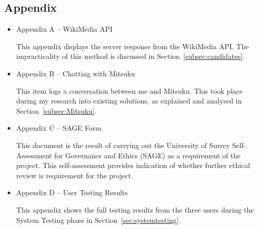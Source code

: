 \subsection*{Appendix}
\begin{itemize}
	\item Appendix A -- WikiMedia API
	\par This appendix displays the server response from the WikiMedia API. The impracticality of this method is discussed in Section~\ref{subsec:candidates}.
	
	\item Appendix B -- Chatting with Mitsuku
	\par This item logs a conversation between me and Mitsuku. This took place during my research into existing solutions, as explained and analysed in Section~\ref{subsec:Mitsuku}.
	
	\item Appendix C -- SAGE Form
	\par This document is the result of carrying out the University of Surrey Self-Assessment for Governance and Ethics (SAGE) as a requirement of the project. This self-assessment provides indication of whether further ethical review is requirement for the project.
	
	\item Appendix D -- User Testing Results
	\par This appendix shows the full testing results from the three users during the System Testing phase in Section~\ref{sec:systemtesting}.
\end{itemize}

